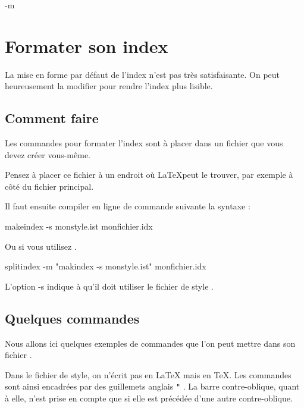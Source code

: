 -m\chapter{Formater son index}\label{styleindex}

\begin{prealable}
La mise en forme par défaut de l'index n'est pas très satisfaisante. On peut heureusement la modifier pour rendre l'index plus lisible.
\end{prealable}

\section{Comment faire}
Les commandes pour formater l'index sont à placer dans un fichier  que vous devez créer vous-même.

\begin{attention}
Pensez à placer ce fichier à un endroit où \LaTeX peut le trouver, par exemple à côté du fichier principal.
\end{attention}

Il faut ensuite compiler en ligne de commande suivante la syntaxe :
\begin{bashcode}
makeindex -s monstyle.ist monfichier.idx
\end{bashcode}

Ou si vous utilisez .

\begin{bashcode}
splitindex -m "makindex -s monstyle.ist" monfichier.idx
\end{bashcode}

L'option -s indique à   qu'il doit utiliser le fichier de style .

\section{Quelques commandes}

Nous allons ici quelques exemples de commandes que l'on peut mettre dans son fichier . 

\begin{attention}
Dans le fichier de style, on n'écrit pas en \LaTeX{} mais en \TeX . Les commandes sont ainsi encadrées par des guillemets anglais \verb|"| . La barre contre-oblique, quant à elle, n'est prise en compte que si elle est précédée d'une autre contre-oblique.
\end{attention}

